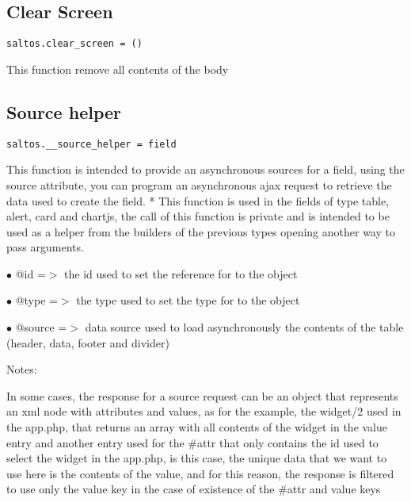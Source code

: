 \documentclass[a4paper]{book}
\begin{document}
\hypertarget{toc364}{}
\subsection{Clear Screen}

\begin{lstlisting}
saltos.clear_screen = ()
\end{lstlisting}

This function remove all contents of the body

\hypertarget{toc365}{}
\subsection{Source helper}

\begin{lstlisting}
saltos.__source_helper = field
\end{lstlisting}

This function is intended to provide an asynchronous sources for a field, using the source attribute,
you can program an asynchronous ajax request to retrieve the data used to create the field.
*
This function is used in the fields of type table, alert, card and chartjs, the call of this function
is private and is intended to be used as a helper from the builders of the previous types opening
another way to pass arguments.

\begin{compactitem}
\item[\color{myblue}$\bullet$] @id     =$>$ the id used to set the reference for to the object
\item[\color{myblue}$\bullet$] @type   =$>$ the type used to set the type for to the object
\item[\color{myblue}$\bullet$] @source =$>$ data source used to load asynchronously the contents of the table (header, data,
           footer and divider)
\end{compactitem}

Notes:

In some cases, the response for a source request can be an object that represents an xml node with
attributes and values, as for the example, the widget/2 used in the app.php, that returns an array
with all contents of the widget in the value entry and another entry used for the \#attr that only
contains the id used to select the widget in the app.php, is this case, the unique data that we want
to use here is the contents of the value, and for this reason, the response is filtered to use only
the value key in the case of existence of the \#attr and value keys
\end{document}
